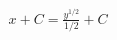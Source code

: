 \documentclass[preview]{standalone}
\begin{document}
\begin{align*}
x + C = \frac{y^{1/2}}{1/2} + C
\end{align*}
\end{document}
